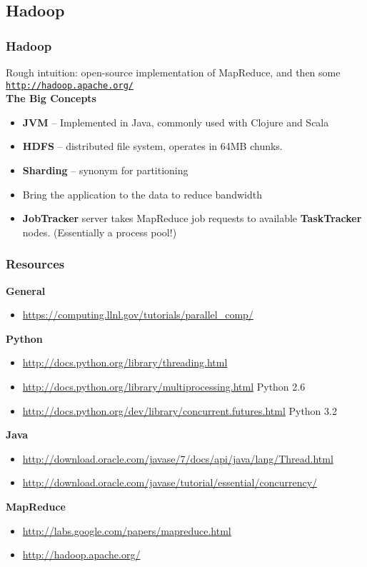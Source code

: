 \documentclass{beamer}
\begin{document}
\subsection{Hadoop}
\begin{frame}
\frametitle{Hadoop}
Rough intuition: open-source implementation of MapReduce, and then some
\texttt{\url{http://hadoop.apache.org/}} \\

\pause
\bigskip
\textbf{The Big Concepts}
\begin{itemize}
  \item \textbf{JVM} -- Implemented in Java, commonly used with Clojure and Scala
  \item \textbf{HDFS} -- distributed file system, operates in 64MB chunks.
  \item \textbf{Sharding} -- synonym for partitioning
  \item Bring the application to the data to reduce bandwidth
  \item \textbf{JobTracker} server takes MapReduce job requests to available \textbf{TaskTracker} nodes. (Essentially a process pool!)
\end{itemize}

\end{frame}

\begin{frame}
\frametitle{Resources}
\textbf{General}
\begin{itemize}
  \item \url{https://computing.llnl.gov/tutorials/parallel_comp/}
\end{itemize}

\textbf{Python}
\begin{itemize}
  \item \url{http://docs.python.org/library/threading.html}
  \item \url{http://docs.python.org/library/multiprocessing.html} \tiny{Python 2.6}
  \item \url{http://docs.python.org/dev/library/concurrent.futures.html} \tiny{Python 3.2}
\end{itemize}

\textbf{Java}
\begin{itemize}
  \item \url{http://download.oracle.com/javase/7/docs/api/java/lang/Thread.html}
  \item \url{http://download.oracle.com/javase/tutorial/essential/concurrency/}
\end{itemize}

\textbf{MapReduce}
\begin{itemize}
  \item \url{http://labs.google.com/papers/mapreduce.html}
  \item \url{http://hadoop.apache.org/}
\end{itemize}
\end{frame}

\frame{\tableofcontents}

\frame{\titlepage}
\end{document}
